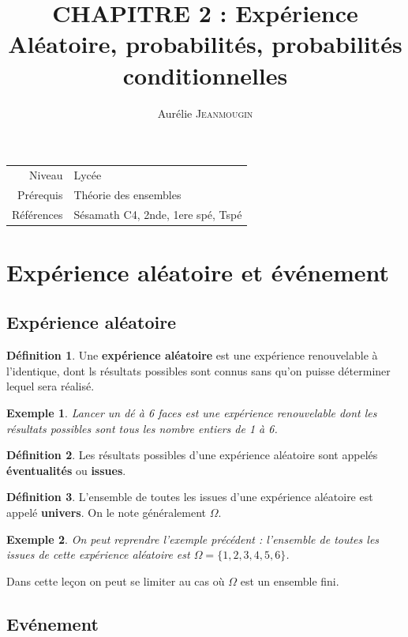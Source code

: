 \documentclass[a4paper,12pt,final]{article}
\title{CHAPITRE 2 : Expérience Aléatoire, probabilités, probabilités conditionnelles}
\author{Aurélie \textsc{Jeanmougin}}
\newtheorem{Ex}{Exemple}[section]
\theoremstyle{theorem}
\theoremstyle{definition}
\theoremstyle{definition}
\theoremstyle{definition}
\newtheorem{Def}{Définition}[section]
\begin{document}
	
	\maketitle
	
\begin{tabular}{r | l}
	Niveau & Lycée \\
	Prérequis & Théorie des ensembles \\
	Références & Sésamath C4, 2nde, 1ere spé, Tspé
\end{tabular}

\section{Expérience aléatoire et événement}
	\subsection{Expérience aléatoire}
		\begin{Def}
			Une \textbf{expérience aléatoire} est une expérience renouvelable à l'identique, dont ls résultats possibles sont connus sans qu'on puisse déterminer lequel sera réalisé.
		\end{Def}
	
		\begin{Ex}
			Lancer un dé à 6 faces est une expérience renouvelable dont les résultats possibles sont tous les nombre entiers de 1 à 6.
		\end{Ex}
	
		\begin{Def}
			Les résultats possibles d'une expérience aléatoire sont appelés \textbf{éventualités} ou \textbf{issues}.
		\end{Def}
	
		\begin{Def}
			L'ensemble de toutes les issues d'une expérience aléatoire est appelé \textbf{univers}. On le note généralement $\Omega$.
		\end{Def}
		
		\begin{Ex}
			On peut reprendre l'exemple précédent : l'ensemble de toutes les issues de cette expérience aléatoire est $\Omega = \{1,2,3,4,5,6\}$.
		\end{Ex}
	
	Dans cette leçon on peut se limiter au cas où $\Omega$ est un ensemble fini.
	
	\subsection{Evénement}
		
\end{document}
